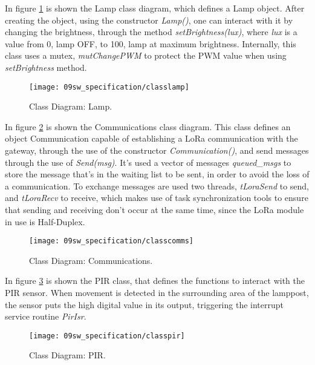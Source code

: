 
In figure \ref{fig:classlamp} is shown the Lamp class diagram, which defines a Lamp object. After creating the object, using the constructor \textit{Lamp()}, one can interact with it by changing the brightness, through the method \textit{setBrightness(lux)}, where \textit{lux} is a value from 0, lamp OFF, to 100, lamp at maximum brightness. Internally, this class uses a mutex, \textit{mutChangePWM} to protect the PWM value when using \textit{setBrightness} method. 

\begin{figure}[H]
	\centering
	\texttt{[image: 09sw\_specification/classlamp]}
	\caption{Class Diagram: Lamp.}
	\label{fig:classlamp}
\end{figure}


In figure \ref{fig:classcomm} is shown the Communications class diagram. This class defines an object Communication capable of establishing a LoRa communication with the gateway, through the use of the constructor \textit{Communication()}, and send messages through the use of \textit{Send(msg)}. It's used a vector of messages \textit{queued\_msgs} to store the message that's in the waiting list to be sent, in order to avoid the loss of a communication. To exchange messages are used two threads, \textit{tLoraSend} to send, and \textit{tLoraRecv} to receive, which makes use of task synchronization tools to ensure that sending and receiving don't occur at the same time, since the LoRa module in use is Half-Duplex.

\begin{figure}[H]
	\centering
	\texttt{[image: 09sw\_specification/classcomms]}
	\caption{Class Diagram: Communications.}
	\label{fig:classcomm}
\end{figure}


In figure \ref{fig:classpir} is shown the PIR class, that defines the functions to interact with the PIR sensor. When movement is detected in the surrounding area of the lamppost, the sensor puts the high digital value in its output, triggering the interrupt service routine \textit{PirIsr}.

\begin{figure}[H]
	\centering
	\texttt{[image: 09sw\_specification/classpir]}
	\caption{Class Diagram: PIR.}
	\label{fig:classpir}
\end{figure}

